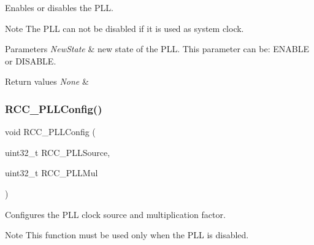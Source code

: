 Enables or disables the P\+LL. 

\begin{DoxyNote}{Note}
The P\+LL can not be disabled if it is used as system clock. 
\end{DoxyNote}

\begin{DoxyParams}{Parameters}
{\em New\+State} & new state of the P\+LL. This parameter can be\+: E\+N\+A\+B\+LE or D\+I\+S\+A\+B\+LE. \\
\hline
\end{DoxyParams}

\begin{DoxyRetVals}{Return values}
{\em None} & \\
\hline
\end{DoxyRetVals}
\mbox{\label{group___r_c_c___exported___functions_ga0f67634cbe721f2c42f022d2a93229c8}} 
\subsubsection{\texorpdfstring{RCC\_PLLConfig()}{RCC\_PLLConfig()}}
{\footnotesize\ttfamily void R\+C\+C\+\_\+\+P\+L\+L\+Config (\begin{DoxyParamCaption}\item[{uint32\+\_\+t}]{R\+C\+C\+\_\+\+P\+L\+L\+Source,  }\item[{uint32\+\_\+t}]{R\+C\+C\+\_\+\+P\+L\+L\+Mul }\end{DoxyParamCaption})}



Configures the P\+LL clock source and multiplication factor. 

\begin{DoxyNote}{Note}
This function must be used only when the P\+LL is disabled. 
\end{DoxyNote}

